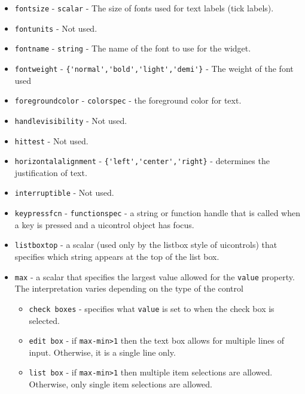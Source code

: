 \begin{itemize}
\item  \verb|fontsize| - \verb|scalar| - The size of fonts used for text labels (tick labels).

\item  \verb|fontunits| - Not used.

\item  \verb|fontname| - \verb|string| - The name of the font to use for the widget.

\item  \verb|fontweight| - \verb|{'normal','bold','light','demi'}| - The weight of the font used

\item  \verb|foregroundcolor| - \verb|colorspec| - the foreground color for text.

\item  \verb|handlevisibility| - Not used.

\item  \verb|hittest| - Not used.

\item  \verb|horizontalalignment| - \verb|{'left','center','right}| - determines
the justification of text.

\item  \verb|interruptible| - Not used.

\item  \verb|keypressfcn| - \verb|functionspec| - a string or function handle
 that is called when a key is pressed and a uicontrol object has focus.

\item  \verb|listboxtop| - a scalar (used only by the listbox style of
uicontrols) that specifies which string appears at the top of the list
box.

\item  \verb|max| - a scalar that specifies the largest value allowed
for the \verb|value| property.  The interpretation varies depending on
the type of the control
\begin{itemize}

\item  \verb|check boxes| - specifies what \verb|value| is set to when the
check box is selected.

\item  \verb|edit box| - if \verb|max-min>1| then the text box allows for
multiple lines of input.  Otherwise, it is a single line only.

\item  \verb|list box| - if \verb|max-min>1| then multiple item selections
are allowed.  Otherwise, only single item selections are allowed.


\end{itemize}
\end{itemize}
